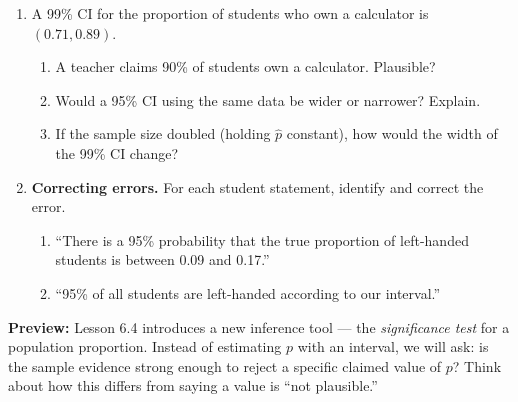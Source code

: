 \documentclass[10pt]{article}
\begin{document}
\begin{enumerate}
  \newpage
  \item A 99\% CI for the proportion of students who own a calculator is $(0.71, 0.89)$.
        \begin{enumerate}[label=\alph*.]
          \item A teacher claims 90\% of students own a calculator. Plausible? 
          \item Would a 95\% CI using the same data be wider or narrower? Explain.
          \item If the sample size doubled (holding $\hat p$ constant), how would the width of
                the 99\% CI change? 
        \end{enumerate}

  \newpage
  \item \textbf{Correcting errors.} For each student statement, identify and correct the error.
        \begin{enumerate}[label=\alph*.]
          \item ``There is a 95\% probability that the true proportion of left-handed students
                is between 0.09 and 0.17.'' 
          \item ``95\% of all students are left-handed according to our interval.'' 
        \end{enumerate}

\end{enumerate}

\begin{reflectionbox}
\textbf{Preview:} Lesson 6.4 introduces a new inference tool --- the \emph{significance test} for
a population proportion. Instead of estimating $p$ with an interval, we will ask: is the sample
evidence strong enough to reject a specific claimed value of $p$? Think about how this differs
from saying a value is ``not plausible.''
\end{reflectionbox}
\end{document}
